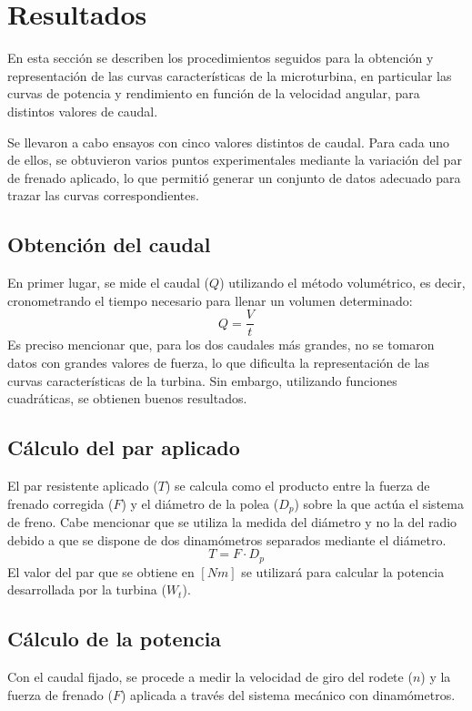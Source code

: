 \documentclass[10pt]{IEEEtran}
\begin{document}
\section{Resultados}
En esta sección se describen los procedimientos seguidos para la obtención y representación de las curvas características de la microturbina, en particular las curvas de potencia y rendimiento en función de la velocidad angular, para distintos valores de caudal.

Se llevaron a cabo ensayos con cinco valores distintos de caudal. Para cada uno de ellos, se obtuvieron varios puntos experimentales mediante la variación del par de frenado aplicado, lo que permitió generar un conjunto de datos adecuado para trazar las curvas correspondientes.

\subsection{Obtención del caudal}
En primer lugar, se mide el caudal ($Q$) utilizando el método volumétrico, es decir, cronometrando el tiempo necesario para llenar un volumen determinado:
\begin{equation}
  Q = \frac{V}{t}
\end{equation}
Es preciso mencionar que, para los dos caudales más grandes, no se tomaron datos con grandes valores de fuerza, lo que dificulta la representación de las curvas características de la turbina. Sin embargo, utilizando funciones cuadráticas, se obtienen buenos resultados.

\subsection{Cálculo del par aplicado}
El par resistente aplicado ($T$) se calcula como el producto entre la fuerza de frenado corregida ($F$) y el diámetro de la polea ($D_p$) sobre la que actúa el sistema de freno. Cabe mencionar que se utiliza la medida del diámetro y no la del radio debido a que se dispone de dos dinamómetros separados mediante el diámetro.
\begin{equation}
  T = F \cdot D_p
\end{equation}
El valor del par que se obtiene en $[Nm]$ se utilizará para calcular la potencia desarrollada por la turbina ($W_t$).

\subsection{Cálculo de la potencia}
Con el caudal fijado, se procede a medir la velocidad de giro del rodete ($n$) y la fuerza de frenado ($F$) aplicada a través del sistema mecánico con dinamómetros.
\end{document}
